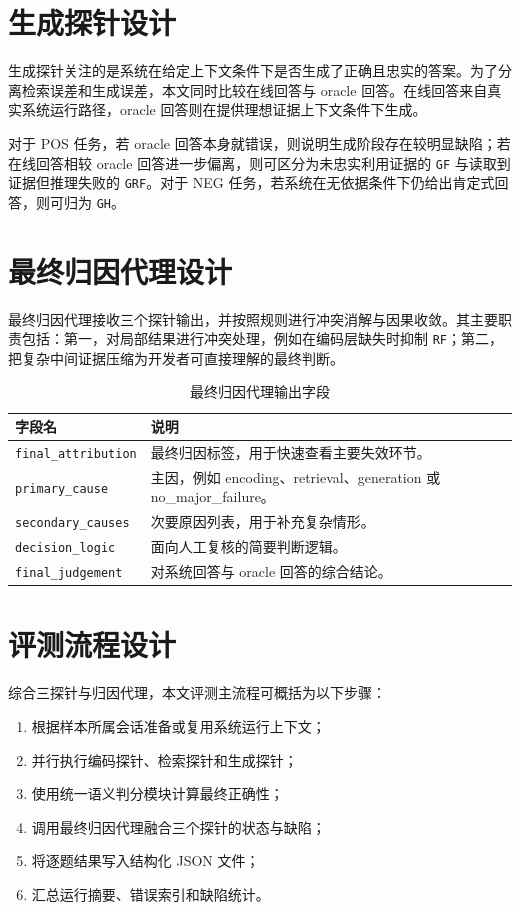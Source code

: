\section{生成探针设计}

生成探针关注的是系统在给定上下文条件下是否生成了正确且忠实的答案。为了分离检索误差和生成误差，本文同时比较在线回答与 oracle 回答。在线回答来自真实系统运行路径，oracle 回答则在提供理想证据上下文条件下生成。

对于 POS 任务，若 oracle 回答本身就错误，则说明生成阶段存在较明显缺陷；若在线回答相较 oracle 回答进一步偏离，则可区分为未忠实利用证据的 \texttt{GF} 与读取到证据但推理失败的 \texttt{GRF}。对于 NEG 任务，若系统在无依据条件下仍给出肯定式回答，则可归为 \texttt{GH}。

\section{最终归因代理设计}

最终归因代理接收三个探针输出，并按照规则进行冲突消解与因果收敛。其主要职责包括：第一，对局部结果进行冲突处理，例如在编码层缺失时抑制 \texttt{RF}；第二，把复杂中间证据压缩为开发者可直接理解的最终判断。

\begin{table}[htbp]
\centering
\caption{最终归因代理输出字段}
\label{tab:attr-output}
\begin{tabular}{p{}p{}}
\toprule
字段名 & 说明 \\
\midrule
\texttt{final\_attribution} & 最终归因标签，用于快速查看主要失效环节。 \\
\texttt{primary\_cause} & 主因，例如 encoding、retrieval、generation 或 no\_major\_failure。 \\
\texttt{secondary\_causes} & 次要原因列表，用于补充复杂情形。 \\
\texttt{decision\_logic} & 面向人工复核的简要判断逻辑。 \\
\texttt{final\_judgement} & 对系统回答与 oracle 回答的综合结论。 \\
\bottomrule
\end{tabular}
\end{table}

\section{评测流程设计}

综合三探针与归因代理，本文评测主流程可概括为以下步骤：

\begin{enumerate}
    \item 根据样本所属会话准备或复用系统运行上下文；
    \item 并行执行编码探针、检索探针和生成探针；
    \item 使用统一语义判分模块计算最终正确性；
    \item 调用最终归因代理融合三个探针的状态与缺陷；
    \item 将逐题结果写入结构化 JSON 文件；
    \item 汇总运行摘要、错误索引和缺陷统计。
\end{enumerate}

